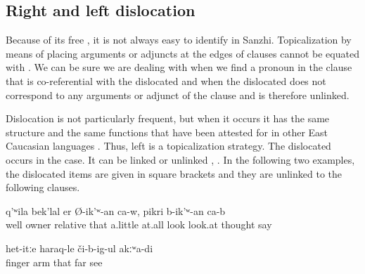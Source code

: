 \subsection{Right and left dislocation}
\label{ssec:Right and left dislocation}

Because of its free , it is not always easy to identify  in Sanzhi. Topicalization by means of placing arguments or adjuncts at the edges of clauses cannot be equated with . We can be sure we are dealing with  when we find a pronoun in the clause that is co-referential with the dislocated  and when the dislocated  does not correspond to any arguments or adjunct of the clause and is therefore unlinked.

Dislocation is not particularly frequent, but when it occurs it has the same structure and the same functions that have been attested for  in other East Caucasian languages \citep{Forker.Belyaev2016}. Thus, left  is a topicalization strategy. The dislocated  occurs in the  case. It can be linked or unlinked , . In the following two examples, the dislocated items are given in square brackets and they are unlinked to the following clauses.
%
\begin{exe}
	\ex	\label{ex:Well, also those own relatives, and those who do not have (relatives), one has to look after them a bit, think of them}
	\gll	[nu	ix-tːi	w-ah-la	tuχum-te=ra		il-tːi	akːʷ-ar-te=ra]	q'ʷila	bek'lal	er	Ø-ik'ʷ-an	ca-w,	pikri	b-ik'ʷ-an	ca-b\\
		well		owner	relative		that		a.little	at.all	look	look.at\tsc{.ipfv-ptcp} 		thought	say	\\
	\glt	{}

	\ex	\label{ex:‎The fingers, the hands, I do not see that far}
	\gll	[t'upː-e=ra	nuˁq-be=ra=q'al]	het-itːe	haraq-le	či-b-ig-ul	akːʷa-di\\
		finger	arm	that\tsc{-advz}	far	see	\\
	\glt	{}
\end{exe}

